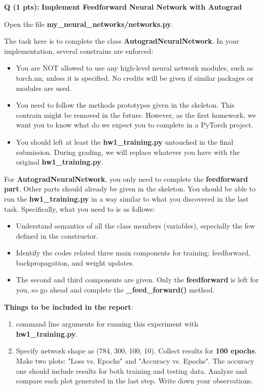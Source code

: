 \documentclass{article}
\newcommand{\homeworknumber}{1}
\newcounter{questionno}
\newcounter{partno}
\newcommand{\question}[1]{
\noindent
\newline
\stepcounter{questionno}
\setcounter{partno}{0}
{\bf Q\arabic{questionno} (#1 pts): }
}
\begin{document}
\question{1}{\bf Implement Feedforward Neural Network with Autograd}

\noindent Open the file \textbf{my\_neural\_networks/networks.py}.

\hfill

\noindent The task here is to complete the class \textbf{AutogradNeuralNetwork}. In your implementation, several constrains are enforced:
\begin{itemize}
  \item You are NOT allowed to use any high-level neural network modules,
    such as torch.nn, unless it is specified. No credits will be given if
    similar packages or modules are used.
  \item You need to follow the methods prototypes given in the skeleton. This
    contrain might be removed in the future. However, as the first homework,
    we want you to know what do we expect you to complete in a PyTorch project.
  \item You should left at least the \textbf{hw\homeworknumber\_training.py} untouched in the final submission.
  During grading, we will replace whatever you have with the original \textbf{hw\homeworknumber\_training.py}.
\end{itemize}

\noindent For \textbf{AutogradNeuralNetwork}, you only need to complete the \textbf{feedforward part}. Other parts should already be given in the skeleton. You should be able to run the \textbf{hw\homeworknumber\_training.py} in a way similar to what you discovered in the last task. Specifically, what you need to is as follows:

\begin{itemize}
  \item Understand semantics of all the class members (variables), especially the few defined in the constructor.
  \item Identify the codes related three main components for training: feedforward, backpropagation, and weight updates.
  \item The second and third components are given. Only the \textbf{feedforward} is left for you, so go ahead and complete the \textbf{\_feed\_forward()} method.
\end{itemize}

\newpage

\noindent \textbf{Things to be included in the report}:
\begin{enumerate}
  \item command line arguments for running this experiment with \textbf{hw\homeworknumber\_training.py}.
  \item Specify network shape as (784, 300, 100, 10). Collect results for \textbf{100 epochs}.
        Make two plots: "Loss vs. Epochs" and "Accuracy vs. Epochs". The
        accuracy one should include results for both training and
        testing data. Analyze and compare each plot generated in the last step. Write down your observations.
\end{enumerate}
\end{document}
